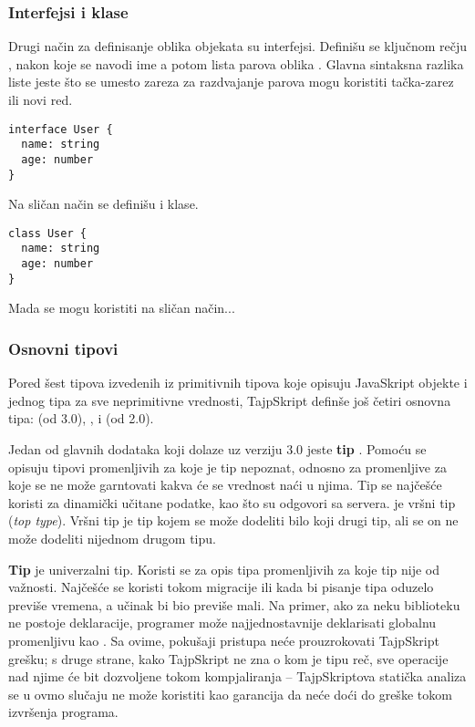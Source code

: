 \subsubsection{Interfejsi i klase}

Drugi način za definisanje oblika objekata su interfejsi.
Definišu se ključnom rečju , nakon koje se navodi ime a potom lista parova oblika .
Glavna sintaksna razlika liste jeste što se umesto zareza za razdvajanje parova mogu koristiti tačka-zarez ili novi red.

\begin{verbatim}
interface User {
  name: string
  age: number
}
\end{verbatim}

Na sličan način se definišu i klase.

\begin{verbatim}
class User {
  name: string
  age: number
}
\end{verbatim}

Mada se mogu koristiti na sličan način...%

\subsubsection{Osnovni tipovi}

Pored šest tipova izvedenih iz primitivnih tipova koje opisuju JavaSkript objekte i jednog tipa za sve neprimitivne vrednosti, TajpSkript definše još četiri osnovna tipa:  (od 3.0), ,  i  (od 2.0).

Jedan od glavnih dodataka koji dolaze uz verziju 3.0 jeste \textbf{tip }.
Pomoću  se opisuju tipovi promenljivih za koje je tip nepoznat, odnosno za promenljive za koje se ne može garntovati kakva će se vrednost naći u njima.
Tip  se najčešće koristi za dinamički učitane podatke, kao što su odgovori sa servera.
 je vršni tip (\textit{top type}).
Vršni tip je tip kojem se može dodeliti bilo koji drugi tip, ali se on ne može dodeliti nijednom drugom tipu.

\textbf{Tip } je univerzalni tip.
Koristi se za opis tipa promenljivih za koje tip nije od važnosti.
Najčešće se koristi tokom migracije ili kada bi pisanje tipa oduzelo previše vremena, a učinak bi bio previše mali.
Na primer, ako za neku biblioteku ne postoje deklaracije, programer može najjednostavnije deklarisati globalnu promenljivu kao .
Sa ovime, pokušaji pristupa  neće prouzrokovati TajpSkript grešku; s druge strane, kako TajpSkript ne zna o kom je tipu reč, sve operacije nad njime će bit dozvoljene tokom kompjaliranja -- TajpSkriptova statička analiza se u ovmo slučaju ne može koristiti kao garancija da neće doći do greške tokom izvršenja programa.

